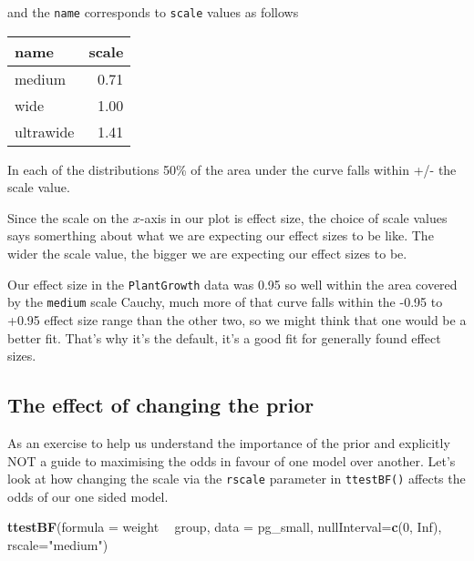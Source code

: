 \documentclass[
]{book}
\newenvironment{Shaded}{\begin{snugshade}}{\end{snugshade}}
\newcommand{\DataTypeTok}[1]{\textcolor[rgb]{0.13,0.29,0.53}{#1}}
\newcommand{\DecValTok}[1]{\textcolor[rgb]{0.00,0.00,0.81}{#1}}
\newcommand{\KeywordTok}[1]{\textcolor[rgb]{0.13,0.29,0.53}{\textbf{#1}}}
\newcommand{\NormalTok}[1]{#1}
\newcommand{\OperatorTok}[1]{\textcolor[rgb]{0.81,0.36,0.00}{\textbf{#1}}}
\newcommand{\OtherTok}[1]{\textcolor[rgb]{0.56,0.35,0.01}{#1}}
\newcommand{\StringTok}[1]{\textcolor[rgb]{0.31,0.60,0.02}{#1}}
\begin{document}
and the \texttt{name} corresponds to \texttt{scale} values as follows

\begin{tabular}{l|r}
\hline
name & scale\\
\hline
medium & 0.71\\
\hline
wide & 1.00\\
\hline
ultrawide & 1.41\\
\hline
\end{tabular}

In each of the distributions 50\% of the area under the curve falls within +/- the scale value.

Since the scale on the \(x\)-axis in our plot is effect size, the choice of scale values says somerthing about what we are expecting our effect sizes to be like. The wider the scale value, the bigger we are expecting our effect sizes to be.

Our effect size in the \texttt{PlantGrowth} data was 0.95 so well within the area covered by the \texttt{medium} scale Cauchy, much more of that curve falls within the -0.95 to +0.95 effect size range than the other two, so we might think that one would be a better fit. That's why it's the default, it's a good fit for generally found effect sizes.

\hypertarget{the-effect-of-changing-the-prior}{%
\subsection{The effect of changing the prior}\label{the-effect-of-changing-the-prior}}

As an exercise to help us understand the importance of the prior and explicitly NOT a guide to maximising the odds in favour of one model over another. Let's look at how changing the scale via the \texttt{rscale} parameter in \texttt{ttestBF()} affects the odds of our one sided model.

\begin{Shaded}
\begin{Highlighting}[]
\KeywordTok{ttestBF}\NormalTok{(}\DataTypeTok{formula =}\NormalTok{  weight }\OperatorTok{~}\StringTok{ }\NormalTok{group, }\DataTypeTok{data =}\NormalTok{ pg_small, }\DataTypeTok{nullInterval=}\KeywordTok{c}\NormalTok{(}\DecValTok{0}\NormalTok{, }\OtherTok{Inf}\NormalTok{), }\DataTypeTok{rscale=}\StringTok{"medium"}\NormalTok{)}
\end{Highlighting}
\end{Shaded}
\end{document}

